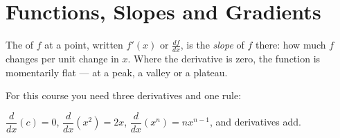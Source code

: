 \section{Functions, Slopes and Gradients}

\begin{definitionbox}[Derivative]
The  of $f$ at a point, written $f'(x)$ or $\frac{df}{dx}$, is the
\emph{slope} of $f$ there: how much $f$ changes per unit change in $x$. Where the
derivative is zero, the function is momentarily flat --- at a peak, a valley or a
plateau.
\end{definitionbox}

For this course you need three derivatives and one rule:

\begin{center}
$\dfrac{d}{dx}(c) = 0$, \qquad
$\dfrac{d}{dx}(x^2) = 2x$, \qquad
$\dfrac{d}{dx}(x^n) = n x^{n-1}$, \qquad
and derivatives add.
\end{center}

